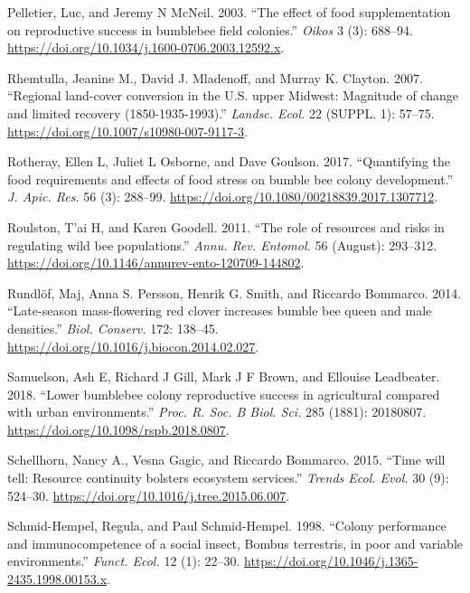 \documentclass[11pt,]{article}
\begin{document}
\leavevmode\hypertarget{ref-Pelletier2003}{}%
Pelletier, Luc, and Jeremy N McNeil. 2003. ``The effect of food
supplementation on reproductive success in bumblebee field colonies.''
\emph{Oikos} 3 (3): 688--94.
\url{https://doi.org/10.1034/j.1600-0706.2003.12592.x}.

\leavevmode\hypertarget{ref-Rhemtulla2007}{}%
Rhemtulla, Jeanine M., David J. Mladenoff, and Murray K. Clayton. 2007.
``Regional land-cover conversion in the U.S. upper Midwest: Magnitude of
change and limited recovery (1850-1935-1993).'' \emph{Landsc. Ecol.} 22
(SUPPL. 1): 57--75. \url{https://doi.org/10.1007/s10980-007-9117-3}.

\leavevmode\hypertarget{ref-Rotheray2017}{}%
Rotheray, Ellen L, Juliet L Osborne, and Dave Goulson. 2017.
``Quantifying the food requirements and effects of food stress on bumble
bee colony development.'' \emph{J. Apic. Res.} 56 (3): 288--99.
\url{https://doi.org/10.1080/00218839.2017.1307712}.

\leavevmode\hypertarget{ref-Roulston2011}{}%
Roulston, T'ai H, and Karen Goodell. 2011. ``The role of resources and
risks in regulating wild bee populations.'' \emph{Annu. Rev. Entomol.}
56 (August): 293--312.
\url{https://doi.org/10.1146/annurev-ento-120709-144802}.

\leavevmode\hypertarget{ref-Rundlof2014}{}%
Rundlöf, Maj, Anna S. Persson, Henrik G. Smith, and Riccardo Bommarco.
2014. ``Late-season mass-flowering red clover increases bumble bee queen
and male densities.'' \emph{Biol. Conserv.} 172: 138--45.
\url{https://doi.org/10.1016/j.biocon.2014.02.027}.

\leavevmode\hypertarget{ref-Samuelson2018}{}%
Samuelson, Ash E, Richard J Gill, Mark J F Brown, and Ellouise
Leadbeater. 2018. ``Lower bumblebee colony reproductive success in
agricultural compared with urban environments.'' \emph{Proc. R. Soc. B
Biol. Sci.} 285 (1881): 20180807.
\url{https://doi.org/10.1098/rspb.2018.0807}.

\leavevmode\hypertarget{ref-Schellhorn2015c}{}%
Schellhorn, Nancy A., Vesna Gagic, and Riccardo Bommarco. 2015. ``Time
will tell: Resource continuity bolsters ecosystem services.''
\emph{Trends Ecol. Evol.} 30 (9): 524--30.
\url{https://doi.org/10.1016/j.tree.2015.06.007}.

\leavevmode\hypertarget{ref-Schmid-Hempel1998a}{}%
Schmid-Hempel, Regula, and Paul Schmid-Hempel. 1998. ``Colony
performance and immunocompetence of a social insect, Bombus terrestris,
in poor and variable environments.'' \emph{Funct. Ecol.} 12 (1): 22--30.
\url{https://doi.org/10.1046/j.1365-2435.1998.00153.x}.
\end{document}
